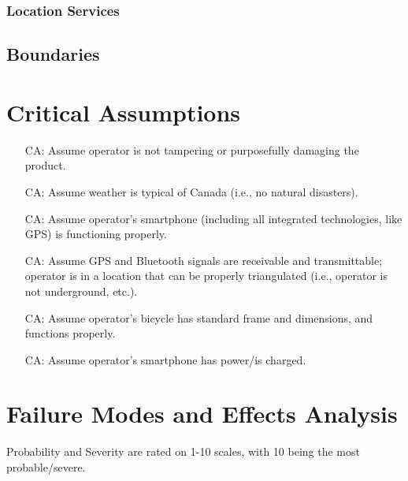 \documentclass{article}
\newcounter{canum} %
\begin{document}
\subsubsection {Location Services}
\subsection {Boundaries}


\section{Critical Assumptions}

\begin{itemize}

\item[CA\refstepcounter{canum}\thecanum\label{CA1}:] Assume operator is not tampering or purposefully damaging the product.
\item[CA\refstepcounter{canum}\thecanum\label{CA2}:] Assume weather is typical of Canada (i.e., no natural disasters).
\item[CA\refstepcounter{canum}\thecanum\label{CA3}:] Assume operator's smartphone (including all integrated technologies, like GPS) is functioning properly.
\item[CA\refstepcounter{canum}\thecanum\label{CA4}:] Assume GPS and Bluetooth signals are receivable and transmittable; operator is in a location that can be properly triangulated (i.e., operator is not underground, etc.). 
\item[CA\refstepcounter{canum}\thecanum\label{CA5}:] Assume operator's bicycle has standard frame and dimensions, and functions properly.
\item[CA\refstepcounter{canum}\thecanum\label{CA6}:] Assume operator's smartphone has power/is charged. 

\end{itemize}


\section{Failure Modes and Effects Analysis}
Probability and Severity are rated on 1-10 scales, with 10 being the most probable/severe. 
\end{document}
